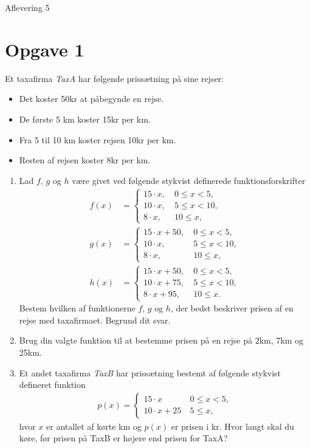 \begin{center}
\Huge
Aflevering 5
\end{center}

\section*{Opgave 1}
Et taxafirma \textit{TaxA} har følgende prissætning på sine rejser: 
\begin{itemize}
\item Det koster 50kr at påbegynde en rejse.
\item De første 5 km koster 15kr per km.
\item Fra 5 til 10 km koster rejsen 10kr per km.
\item Resten af rejsen koster 8kr per km.   
\end{itemize}
\begin{enumerate}[label=\roman*)]
\item Lad $f$, $g$ og $h$ være givet ved følgende stykvist definerede funktionsforskrifter
\begin{align*}
f(x) &= \begin{cases} 15\cdot x, \ &0\leq x < 5,\\
10 \cdot x, \ &5\leq x < 10,\\
8\cdot x, \ &10 \leq x,
\end{cases}\\
g(x) &= \begin{cases}
15\cdot x + 50, \ &0\leq x < 5,\\
10 \cdot x, \ &5\leq x < 10,\\
8\cdot x, \ &10 \leq x,
\end{cases}\\
h(x) &= \begin{cases}
15\cdot x + 50, \ &0\leq x < 5,\\
10 \cdot x + 75, \ &5\leq x < 10,\\
8\cdot x +95, \ &10 \leq x.
\end{cases}
\end{align*}
Bestem hvilken af funktionerne $f$, $g$ og $h$, der bedst beskriver prisen af en rejse med taxafirmaet. Begrund dit svar.
\item Brug din valgte funktion til at bestemme prisen på en rejse på $2$km, 7km og 25km.
\item Et andet taxafirma \textit{TaxB} har prissætning bestemt af følgende stykvist defineret funktion
\begin{align*}
p(x) = 
\begin{cases}
15\cdot x \ &0\leq x < 5,\\
10 \cdot x + 25 \ &5 \leq x,
\end{cases}
\end{align*}
hvor $x$ er antallet af kørte km og $p(x)$ er prisen i kr. Hvor langt skal du køre, før prisen på TaxB er højere end prisen for TaxA?
\end{enumerate}

